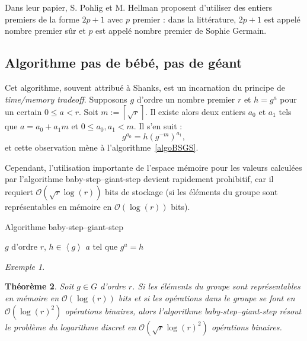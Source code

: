 \documentclass[a4paper, titlepage]{article}
\newtheorem{theo}{Théorème}[section]
\theoremstyle{definition}
\theoremstyle{remark}
\newtheorem{exem}[theo]{Exemple}
\def\O{\mathcal O}
\def\gen #1{\left\langle#1\right\rangle}
\def\ceil #1{\left\lceil#1\right\rceil}
\begin{document}
Dans leur papier, S. Pohlig et M. Hellman proposent d'utiliser des entiers premiers de la forme $2p + 1$ avec $p$ premier : dans la littérature, $2p + 1$ est appelé nombre premier sûr et $p$ est appelé nombre premier de Sophie Germain.

\subsection{Algorithme pas de bébé, pas de géant}
\label{BSGS}

Cet algorithme, souvent attribué à Shanks, est un incarnation du principe de \textit{time/memory tradeoff}. Supposons $g$ d'ordre un nombre premier $r$ et $h = g^a$ pour un certain $0 \leqslant a < r$. Soit $m := \ceil{\sqrt{r}}$. Il existe alors deux entiers $a_0$ et $a_1$ tels que $a = a_0 + a_1m$ et $0 \leqslant a_0, a_1 < m$. Il s'en suit :
$$g^{a_0} = h{(g^{-m})}^{a_1},$$
et cette observation mène à l'algorithme~\ref{algoBSGS}.

Cependant, l'utilisation importante de l'espace mémoire pour les valeurs calculées par l'algorithme baby-step--giant-step devient rapidement prohibitif, car il requiert $\O(\sqrt{r}\log(r))$ bits de stockage (si les éléments du groupe sont représentables en mémoire en $\O(\log(r))$ bits).

\begin{algorithm}[H]
\caption{Algorithme baby-step--giant-step}
\label{algoBSGS}
\begin{algorithmic}[1]
\REQUIRE $g$ d'ordre $r$, $h \in \gen{g}$
\ENSURE $a$ tel que $g^a = h$
\STATE{$m \gets \ceil{\sqrt{r}}$}
\ENDFOR
{}
\ENDWHILE
{}
\end{algorithmic}
\end{algorithm}

\begin{exem}

\end{exem}

\begin{theo}
Soit $g \in G$ d'ordre $r$. Si les éléments du groupe sont représentables en mémoire en $\O(\log(r))$ bits et si les opérations dans le groupe se font en $\O(\log(r)^2)$ opérations binaires, alors l'algorithme baby-step--giant-step résout le problème du logarithme discret en $\O(\sqrt{r}\log(r)^2)$ opérations binaires.
\end{theo}
\end{document}
